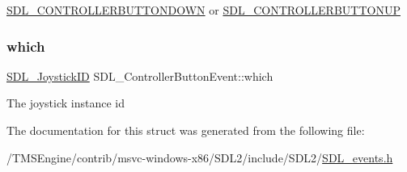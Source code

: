 \hyperlink{_s_d_l__events_8h_a3b589e89be6b35c02e0dd34a55f3fccaaafe044d5f92ac9608ded473218569474}{S\+D\+L\+\_\+\+C\+O\+N\+T\+R\+O\+L\+L\+E\+R\+B\+U\+T\+T\+O\+N\+D\+O\+WN} or \hyperlink{_s_d_l__events_8h_a3b589e89be6b35c02e0dd34a55f3fccaa8cb5a10b1ae0e185ef69a321d3d2d1be}{S\+D\+L\+\_\+\+C\+O\+N\+T\+R\+O\+L\+L\+E\+R\+B\+U\+T\+T\+O\+N\+UP} \mbox{\label{struct_s_d_l___controller_button_event_a98777e88b5d5cae83eef16ffd4bcacc1}} 
\subsubsection{\texorpdfstring{which}{which}}
{\footnotesize\ttfamily \hyperlink{_s_d_l__joystick_8h_a3c3d32500cb08f76ee8077983912c0bd}{S\+D\+L\+\_\+\+Joystick\+ID} S\+D\+L\+\_\+\+Controller\+Button\+Event\+::which}

The joystick instance id 

The documentation for this struct was generated from the following file\+:\begin{DoxyCompactItemize}
\item 
/\+T\+M\+S\+Engine/contrib/msvc-\/windows-\/x86/\+S\+D\+L2/include/\+S\+D\+L2/\hyperlink{_s_d_l__events_8h}{S\+D\+L\+\_\+events.\+h}\end{DoxyCompactItemize}
